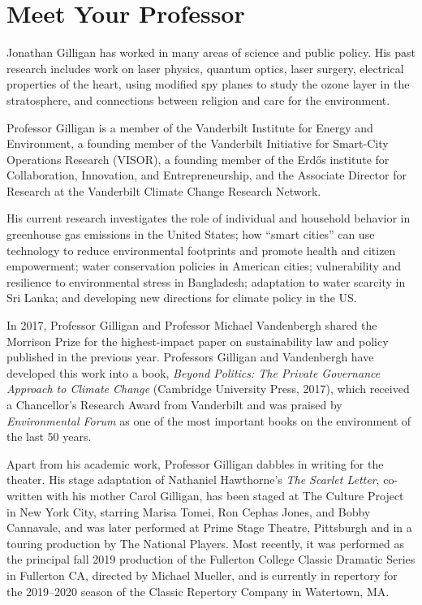 \documentclass[11pt,twoside]{jgsyllabus}\usepackage[]{graphicx}\usepackage[]{color}
\begin{document}
\clearpage
\section{Meet Your Professor}
Jonathan Gilligan has worked in many areas of science and public policy.
His past research includes work on laser physics, quantum optics,
laser surgery, electrical properties of the heart, using modified spy planes to
study the ozone layer in the stratosphere, and connections between religion and
care for the environment.
\iffalse

Professor Gilligan joined the Vanderbilt Faculty in 1994 as a member of the
Department of Physics and Astronomy. In 2003, when the Department of Geology
became the Department of Earth and Environmental Science, Professor Gilligan
joined the new department to focus on atmospheric science, global climate change,
and the interactions of politics, ethics, religion, communication, and the
environment.
\fi

Professor Gilligan is a member of the Vanderbilt Institute for Energy and Environment,
a founding member of the Vanderbilt Initiative for Smart-City Operations Research (VISOR),
a founding member of the Erd\H{o}s institute for Collaboration, Innovation, and
Entrepreneurship,
and the Associate Director for Research at the Vanderbilt Climate Change Research Network.

His current research investigates the role of individual and household behavior
in greenhouse gas emissions in the United States;
how ``smart cities'' can use technology to reduce environmental footprints and
promote health and citizen empowerment;
water conservation policies in American cities;
vulnerability and resilience to environmental stress in Bangladesh;
adaptation to water scarcity in Sri Lanka;
and developing new directions for climate policy in the US.

In 2017, Professor Gilligan and Professor Michael Vandenbergh shared
the Morrison Prize for the highest-impact paper on sustainability law and
policy published in the previous year. Professors Gilligan and Vandenbergh
have developed this work into a book, \emph{Beyond Politics: The Private
Governance Approach to Climate Change\/} (Cambridge University Press, 2017),
which received a Chancellor's Research Award from Vanderbilt and was praised
by \emph{Environmental Forum\/} as one of the most important books on the
environment of the last 50 years.

Apart from his academic work, Professor Gilligan dabbles in writing for the
theater. His stage adaptation of Nathaniel Hawthorne's \emph{The Scarlet Letter},
co-written with his mother Carol Gilligan, has been staged at The Culture
Project in New York City, starring
Marisa Tomei, Ron Cephas Jones, and Bobby Cannavale, and was later performed
at Prime Stage Theatre, Pittsburgh and in a touring production by The National
Players. Most recently, it was performed as the principal fall 2019 production
of the Fullerton College Classic Dramatic Series in Fullerton CA,
directed by Michael Mueller,
and is currently in repertory for the 2019--2020 season of the
Classic Repertory Company in Watertown, MA.
\end{document}
